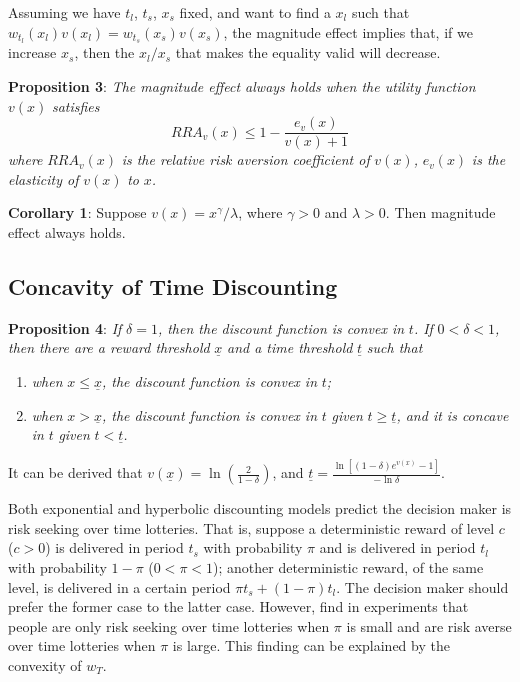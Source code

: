 \documentclass[
  12pt,
]{article}
\providecommand{\tightlist}{%
  \setlength{\itemsep}{0pt}\setlength{\parskip}{0pt}}
\begin{document}
Assuming we have \(t_l\), \(t_s\), \(x_s\) fixed, and want to find a
\(x_l\) such that \(w_{t_l}(x_l)v(x_l) = w_{t_s}(x_s)v(x_s)\), the
magnitude effect implies that, if we increase \(x_s\), then the
\(x_l/x_s\) that makes the equality valid will decrease.

\textbf{Proposition 3}: \emph{The magnitude effect always holds when the
utility function} \(v(x)\) \emph{satisfies}\[
RRA_v(x)\leq 1-\frac{e_v(x)}{v(x)+1}
\]\emph{where} \(RRA_v(x)\) \emph{is the relative risk aversion
coefficient of} \(v(x)\)\emph{,} \(e_v(x)\) \emph{is the elasticity of}
\(v(x)\) \emph{to} \(x\)\emph{.}

\textbf{Corollary 1}: Suppose \(v(x)=x^\gamma/\lambda\), where
\(\gamma>0\) and \(\lambda>0\). Then magnitude effect always holds.

\hypertarget{concavity-of-time-discounting}{%
\subsection{Concavity of Time
Discounting}\label{concavity-of-time-discounting}}

\textbf{Proposition 4}: \emph{If} \(\delta =1\)\emph{, then the discount
function is convex in} \(t\)\emph{. If} \(0<\delta<1\)\emph{, then there
are a reward threshold} \(\underline{x}\) \emph{and a time threshold}
\(\underline{t}\) \emph{such that}

\begin{enumerate}
\def\labelenumi{\arabic{enumi})}
\tightlist
\item
  \emph{when} \(x\leq \underline{x}\)\emph{, the discount function is
  convex in} \(t\)\emph{;}
\item
  \emph{when} \(x > \underline{x}\)\emph{, the discount function is
  convex in} \(t\) \emph{given} \(t\geq \underline{t}\)\emph{, and it is
  concave in} \(t\) \emph{given} \(t<\underline{t}\)\emph{.}
\end{enumerate}

It can be derived that \(v(\underline{x})=\ln(\frac{2}{1-\delta})\), and
\(\underline{t}=\frac{\ln[(1-\delta)e^{v(x)}-1]}{-\ln\delta}\).

Both exponential and hyperbolic discounting models predict the decision
maker is risk seeking over time lotteries. That is, suppose a
deterministic reward of level \(c\) (\(c>0\)) is delivered in period
\(t_s\) with probability \(\pi\) and is delivered in period \(t_l\) with
probability \(1-\pi\) (\(0<\pi<1\)); another deterministic reward, of
the same level, is delivered in a certain period
\(\pi t_s +(1-\pi) t_l\). The decision maker should prefer the former
case to the latter case. However, \citet{onay_intertemporal_2007} find
in experiments that people are only risk seeking over time lotteries
when \(\pi\) is small and are risk averse over time lotteries when
\(\pi\) is large. This finding can be explained by the convexity of
\(w_T\).
\end{document}

